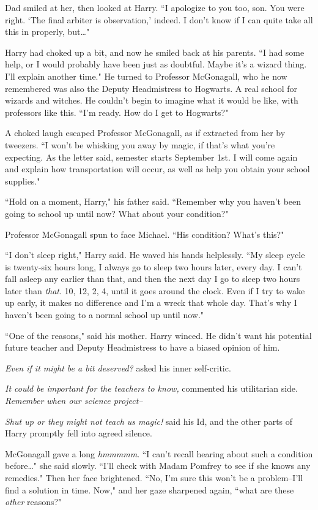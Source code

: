 Dad smiled at her, then looked at Harry. ``I apologize to you too, son. You were right. `The final arbiter is observation,' indeed. I don't know if I can quite take all this in properly, but{\ldots}"

Harry had choked up a bit, and now he smiled back at his parents. ``I had some help, or I would probably have been just as doubtful. Maybe it's a wizard thing. I'll explain another time." He turned to Professor McGonagall, who he now remembered was also the Deputy Headmistress to Hogwarts. A real school for wizards and witches. He couldn't begin to imagine what it would be like, with professors like this. ``I'm ready. How do I get to Hogwarts?"

A choked laugh escaped Professor McGonagall, as if extracted from her by tweezers. ``I won't be whisking you away by magic, if that's what you're expecting. As the letter said, semester starts September 1st. I will come again and explain how transportation will occur, as well as help you obtain your school supplies."

``Hold on a moment, Harry," his father said. ``Remember why you haven't been going to school up until now? What about your condition?"

Professor McGonagall spun to face Michael. ``His condition? What's this?"

``I don't sleep right," Harry said. He waved his hands helplessly. ``My sleep cycle is twenty-six hours long, I always go to sleep two hours later, every day. I can't fall asleep any earlier than that, and then the next day I go to sleep two hours later than \emph{that}. 10\pm, 12\am, 2\am, 4\am, until it goes around the clock. Even if I try to wake up early, it makes no difference and I'm a wreck that whole day. That's why I haven't been going to a normal school up until now."

``One of the reasons," said his mother. Harry winced. He didn't want his potential future teacher and Deputy Headmistress to have a biased opinion of him.

\emph{Even if it might be a bit deserved?} asked his inner self-critic.

\emph{It could be important for the teachers to know,} commented his utilitarian side. \emph{Remember when our science project\---}

\emph{Shut up or they might not teach us magic!} said his Id, and the other parts of Harry promptly fell into agreed silence.

McGonagall gave a long \emph{hmmmmm}. ``I can't recall hearing about such a condition before{\ldots}" she said slowly. ``I'll check with Madam Pomfrey to see if she knows any remedies." Then her face brightened. ``No, I'm sure this won't be a problem\---I'll find a solution in time. Now," and her gaze sharpened again, ``what are these \emph{other} reasons?"


